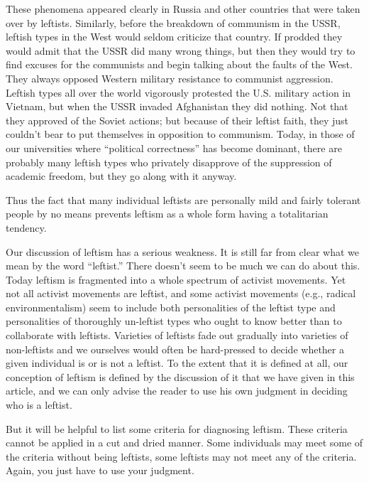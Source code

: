  These phenomena appeared clearly in Russia and other countries that were taken over by leftists. Similarly, before the breakdown of communism in the USSR, leftish types in the West would seldom criticize that country. If prodded they would admit that the USSR did many wrong things, but then they would try to find excuses for the communists and begin talking about the faults of the West. They always opposed Western military resistance to communist aggression. Leftish types all over the world vigorously protested the U.S. military action in Vietnam, but when the USSR invaded Afghanistan they did nothing. Not that they approved of the Soviet actions; but because of their leftist faith, they just couldn’t bear to put themselves in opposition to communism. Today, in those of our universities where “political correctness” has become dominant, there are probably many leftish types who privately disapprove of the suppression of academic freedom, but they go along with it anyway.

 Thus the fact that many individual leftists are personally mild and fairly tolerant people by no means prevents leftism as a whole form having a totalitarian tendency.

 Our discussion of leftism has a serious weakness. It is still far from clear what we mean by the word “leftist.” There doesn’t seem to be much we can do about this. Today leftism is fragmented into a whole spectrum of activist movements. Yet not all activist movements are leftist, and some activist movements (e.g., radical environmentalism) seem to include both personalities of the leftist type and personalities of thoroughly un-leftist types who ought to know better than to collaborate with leftists. Varieties of leftists fade out gradually into varieties of non-leftists and we ourselves would often be hard-pressed to decide whether a given individual is or is not a leftist. To the extent that it is defined at all, our conception of leftism is defined by the discussion of it that we have given in this article, and we can only advise the reader to use his own judgment in deciding who is a leftist.

 But it will be helpful to list some criteria for diagnosing leftism. These criteria cannot be applied in a cut and dried manner. Some individuals may meet some of the criteria without being leftists, some leftists may not meet any of the criteria. Again, you just have to use your judgment.

